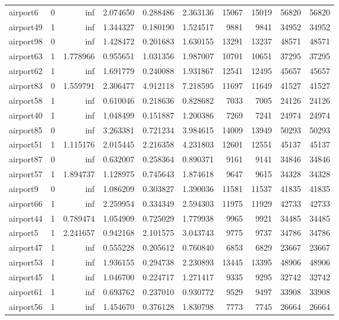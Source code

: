 \begin{longtable}{|l|r|r|r|r|r|r|r|r|r|}
airport6 & 0 & inf & 2.074650 & 0.288486 & 2.363136 & 15067 & 15019 & 56820 & 56820 \\
airport49 & 1 & inf & 1.344327 & 0.180190 & 1.524517 & 9881 & 9841 & 34952 & 34952 \\
airport98 & 0 & inf & 1.428472 & 0.201683 & 1.630155 & 13291 & 13237 & 48571 & 48571 \\
airport63 & 1 & 1.778966 & 0.955651 & 1.031356 & 1.987007 & 10701 & 10651 & 37295 & 37295 \\
airport62 & 1 & inf & 1.691779 & 0.240088 & 1.931867 & 12541 & 12495 & 45657 & 45657 \\
airport83 & 0 & 1.559791 & 2.306477 & 4.912118 & 7.218595 & 11697 & 11649 & 41527 & 41527 \\
airport58 & 1 & inf & 0.610046 & 0.218636 & 0.828682 & 7033 & 7005 & 24126 & 24126 \\
airport40 & 1 & inf & 1.048499 & 0.151887 & 1.200386 & 7269 & 7241 & 24974 & 24974 \\
airport85 & 0 & inf & 3.263381 & 0.721234 & 3.984615 & 14009 & 13949 & 50293 & 50293 \\
airport51 & 1 & 1.115176 & 2.015445 & 2.216358 & 4.231803 & 12601 & 12551 & 45137 & 45137 \\
airport87 & 0 & inf & 0.632007 & 0.258364 & 0.890371 & 9161 & 9141 & 34846 & 34846 \\
airport57 & 1 & 1.894737 & 1.128975 & 0.745643 & 1.874618 & 9647 & 9615 & 34328 & 34328 \\
airport9 & 0 & inf & 1.086209 & 0.303827 & 1.390036 & 11581 & 11537 & 41835 & 41835 \\
airport66 & 1 & inf & 2.259954 & 0.334349 & 2.594303 & 11975 & 11929 & 42733 & 42733 \\
airport44 & 1 & 0.789474 & 1.054909 & 0.725029 & 1.779938 & 9965 & 9921 & 34485 & 34485 \\
airport5 & 1 & 2.241657 & 0.942168 & 2.101575 & 3.043743 & 9775 & 9737 & 34786 & 34786 \\
airport47 & 1 & inf & 0.555228 & 0.205612 & 0.760840 & 6853 & 6829 & 23667 & 23667 \\
airport53 & 1 & inf & 1.936155 & 0.294738 & 2.230893 & 13445 & 13395 & 48906 & 48906 \\
airport45 & 1 & inf & 1.046700 & 0.224717 & 1.271417 & 9335 & 9295 & 32742 & 32742 \\
airport61 & 1 & inf & 0.693762 & 0.237010 & 0.930772 & 9529 & 9497 & 33908 & 33908 \\
airport56 & 1 & inf & 1.454670 & 0.376128 & 1.830798 & 7773 & 7745 & 26664 & 26664 \\

\end{longtable}
